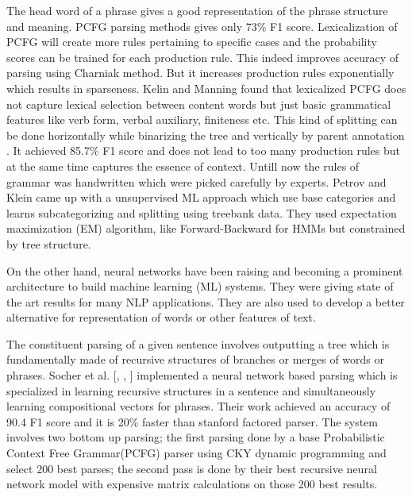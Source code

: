 \documentclass[a4paper, 11pt]{article}
\begin{document}
The head word of a phrase gives a good representation of the phrase structure and meaning. 
PCFG parsing methods gives only 73\% F1 score. Lexicalization of PCFG will create more rules pertaining to specific cases and the probability scores can be trained for each production rule. This indeed improves accuracy of parsing using Charniak method. But it increases production rules exponentially which results in sparseness. Kelin and Manning found that lexicalized PCFG does not capture lexical selection between content words but just basic grammatical features like verb form, verbal auxiliary, finiteness etc. This kind of splitting can be done horizontally while binarizing the tree and vertically by parent annotation \parencite{Gaddy2018}. It achieved 85.7\% F1 score and does not lead to too many production rules but at the same time captures the essence of context. Untill now the rules of grammar was handwritten which were picked carefully by experts. Petrov and Klein came up with a unsupervised ML approach which use base categories and learns subcategorizing and splitting using treebank data. They used expectation maximization (EM) algorithm, like Forward-Backward for HMMs but constrained by tree structure. 

On the other hand, neural networks have been raising and becoming a prominent architecture to build machine learning (ML) systems. They were giving state of the art results for many NLP applications. They are also used to develop a better alternative for representation of words or other features of text. 

The constituent parsing of a given sentence involves outputting a tree which is fundamentally made of recursive structures of branches or merges of words or phrases. Socher et al. [\parencite*{RichardSocher2011}, \parencite*{Socher}, \parencite*{Sochera}] implemented a neural network based parsing which is specialized in learning recursive structures in a sentence and simultaneously learning compositional vectors for phrases. Their work achieved an accuracy of 90.4 F1 score and it is 20\% faster than stanford factored parser. The system involves two bottom up parsing; the first parsing done by a base Probabilistic Context Free Grammar(PCFG) parser using CKY dynamic programming and select 200 best parses; the second pass is done by their best recursive neural network model with expensive matrix calculations on those 200 best results. 

\end{document}
